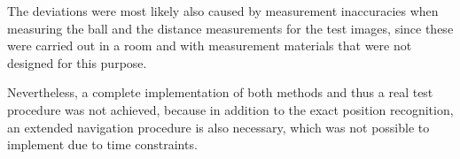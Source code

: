 The deviations were most likely also caused by measurement inaccuracies when measuring the ball and the distance measurements for the test images, since these were carried out in a room and with measurement materials that were not designed for this purpose.

Nevertheless, a complete implementation of both methods and thus a real test procedure was not achieved, because in addition to the exact position recognition, an extended navigation procedure is also necessary, which was not possible to implement due to time constraints.
